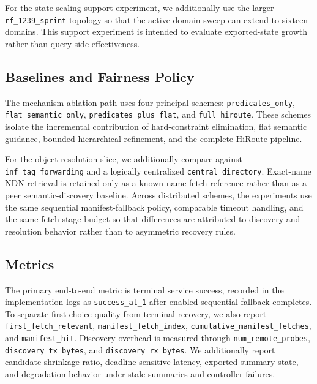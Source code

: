 \documentclass[journal]{IEEEtran}
\newcommand{\sysname}{HiRoute}
\begin{document}
For the state-scaling support experiment, we additionally use the larger \texttt{rf\_1239\_sprint} topology so that the active-domain sweep can extend to sixteen domains. This support experiment is intended to evaluate exported-state growth rather than query-side effectiveness.

\subsection{Baselines and Fairness Policy}

The mechanism-ablation path uses four principal schemes: \texttt{predicates\_only}, \texttt{flat\_semantic\_only}, \texttt{predicates\_plus\_flat}, and \texttt{full\_hiroute}. These schemes isolate the incremental contribution of hard-constraint elimination, flat semantic guidance, bounded hierarchical refinement, and the complete \sysname{} pipeline.

For the object-resolution slice, we additionally compare against \texttt{inf\_tag\_forwarding} and a logically centralized \texttt{central\_directory}. Exact-name NDN retrieval is retained only as a known-name fetch reference rather than as a peer semantic-discovery baseline. Across distributed schemes, the experiments use the same sequential manifest-fallback policy, comparable timeout handling, and the same fetch-stage budget so that differences are attributed to discovery and resolution behavior rather than to asymmetric recovery rules.

\subsection{Metrics}

The primary end-to-end metric is terminal service success, recorded in the implementation logs as \texttt{success\_at\_1} after enabled sequential fallback completes. To separate first-choice quality from terminal recovery, we also report \texttt{first\_fetch\_relevant}, \texttt{manifest\_fetch\_index}, \texttt{cumulative\_manifest\_fetches}, and \texttt{manifest\_hit}. Discovery overhead is measured through \texttt{num\_remote\_probes}, \texttt{discovery\_tx\_bytes}, and \texttt{discovery\_rx\_bytes}. We additionally report candidate shrinkage ratio, deadline-sensitive latency, exported summary state, and degradation behavior under stale summaries and controller failures.
\end{document}
